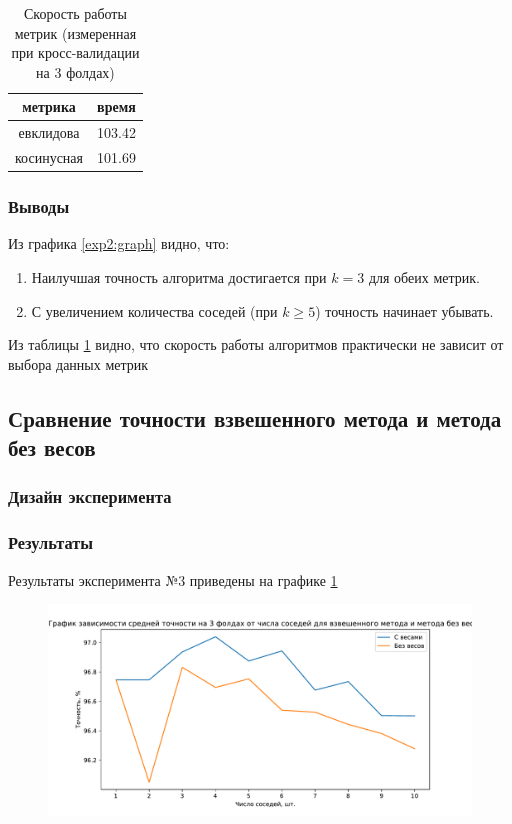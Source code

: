 \documentclass[a4paper, 12pt]{article}
\begin{document}
    \begin{table}[h]
        \begin{center} 
            \caption{Скорость работы метрик (измеренная при кросс-валидации на 3 фолдах)} \label{exp2:speed}
            \begin{tabular}{|c|c|}
                \hline 
                метрика & время \\ 
                \hline 
                евклидова & 103.42 \\ 
                \hline 
                косинусная & 101.69 \\ 
                \hline 
            \end{tabular}
        \end{center}
    \end{table}
    
    \subsubsection{Выводы}
    Из графика \ref{exp2:graph} видно, что:
        \begin{enumerate}
            \item Наилучшая точность алгоритма достигается при $k = 3$ для обеих метрик.
            \item С увеличением количества соседей (при $k \ge 5$) точность начинает убывать.
        \end{enumerate} 
    Из таблицы \ref{exp2:speed} видно, что скорость работы алгоритмов практически не зависит от выбора данных метрик
    \subsection{Сравнение точности взвешенного метода и метода без весов}
    \subsubsection{Дизайн эксперимента}
    \subsubsection{Результаты}
    Результаты эксперимента №3 приведены на графике \ref{exp3:graph}
    \begin{figure}
        \caption{}\label{exp3:graph}
        \includegraphics[width=\textwidth]{../experiment3_graph.pdf}
    \end{figure} 
\end{document}

